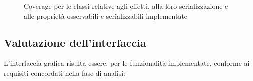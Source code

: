                 \begin{figure}[htbp]
                    \centering
                    \caption{Coverage per le classi relative agli effetti, alla loro serializzazione e alle proprietà osservabili e serializzabili implementate}
                    \label{fig:coverage}
                \end{figure}

            \subsection{Valutazione dell'interfaccia}\label{subsec:valutazione}
                L'interfaccia grafica risulta essere, per le funzionalità implementate, conforme ai requisiti concordati nella fase di analisi:

